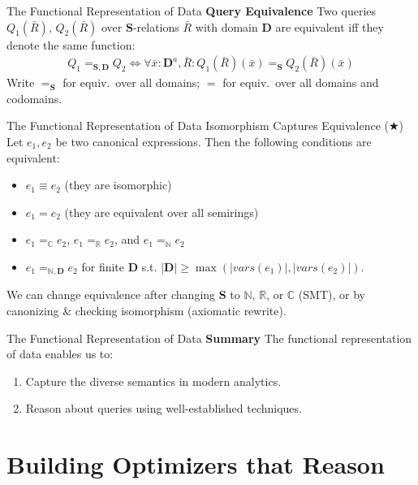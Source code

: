 \documentclass{beamer}
\newcommand{\C}{\mathbb C} %
\newcommand{\N}{\mathbb N} %
\newcommand{\R}{\mathbb R} %
\newcommand{\D}{\mathbf D} %
\newcommand{\SR}{\mathbf S} %
\begin{document}
  \begin{frame}{The Functional Representation of Data}
    \textbf{Query Equivalence} Two queries
    $Q_1({\bar R})$, $Q_2({\bar R})$
    over $\SR$-relations ${\bar R}$ with domain $\mathbf{D}$
    are equivalent iff
    they denote the same function:
    \begin{align*}
    Q_1 =_{\SR,\D} Q_2 \iff
    \forall {\bar x}:\D^a, {\bar R} :
    Q_1({\bar R})({\bar x}) =_{\SR}
    Q_2({\bar R})({\bar x})
    \end{align*} \pause
    Write $=_{\SR}$ for equiv.~over all domains;
    $=$ for equiv.~over all domains and codomains.
  \end{frame}

  \begin{frame}{The Functional Representation of Data}
    \alert{Isomorphism Captures Equivalence} ($\bigstar$)~\cite{spores}
    Let $e_1, e_2$ be two  canonical expressions.
    Then the following conditions are equivalent:
    \begin{itemize}
    \item \label{item:1} $e_1 \equiv e_2$ (they are isomorphic)
    \item \label{item:2} $e_1 = e_2$ (they are equivalent over all semirings)
    \item \label{item:3} $e_1 =_\C e_2$, $e_1 =_\R e_2$, and $e_1 =_\N e_2$
    \item \label{item:6} $e_1 =_{\N, \D} e_2$ for finite $\D$
    s.t. $|\D| \geq \max(|vars(e_1)|, |vars(e_2)|)$.
    \end{itemize} \pause
    We can change equivalence after changing $\SR$ to $\N$, $\R$, or $\C$ (SMT),
    or by canonizing \& checking isomorphism (axiomatic rewrite).
  \end{frame}

  \begin{frame}{The Functional Representation of Data}
    \textbf{Summary} The functional representation of data enables us to:
    \begin{enumerate}
      \item Capture the diverse semantics in modern analytics.
      \item Reason about queries using well-established techniques.
    \end{enumerate}
  \end{frame}
  
  \section{Building Optimizers that Reason}
\end{document}
